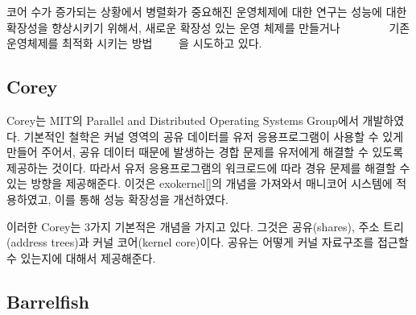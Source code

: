 코어 수가 증가되는 상황에서 병렬화가 중요해진 운영체제에 대한 연구는 성능에
 대한 확장성을 향상시키기 위해서, 새로운 확장성 있는
운영 체제를 만들거나 ~\cite{Boyd-WickizerCorey}~\cite{Wentzlaff2010fOS}
~\cite{Baumann2009Barrelfish}~\cite{Zellweger2014Multikernel}
~\cite{Liu2009Tessellation}~\cite{Farrington2010Helios} 
기존 운영체제를 최적화 시키는
방법~\cite{SilasBoydWickizer2010LinuxScales48}
~\cite{AustinTClements2012RCUBalancedTrees}~\cite{Clements2013RadixVM}~\cite{SilasBoydWickizerPth}을
시도하고 있다.



\subsection{Corey}

Corey는 MIT의 Parallel and Distributed Operating Systems Group에서 개발하였다. 
기본적인 철학은 커널 영역의 공유 데이터를 유저 응용프로그램이 사용할 수 있게 만들어 주어서, 
공유 데이터 때문에 발생하는 경합 문제를 유저에게 해결할 수 있도록 제공하는 것이다. 
따라서 유저 응용프로그램의 워크로드에 따라 경유 문제를 해결할 수 있는 방향을 제공해준다.
이것은 exokernel[]의 개념을 가져와서 매니코어 시스템에 적용하였고, 이를 통해 성능 확장성을 개선하였다.

이러한 Corey는 3가지 기본적은 개념을 가지고 있다. 그것은 공유(shares), 주소 트리(address trees)과 커널
코어(kernel core)이다.
공유는 어떻게 커널 자료구조를 접근할 수 있는지에 대해서 제공해준다.


\subsection{Barrelfish}

